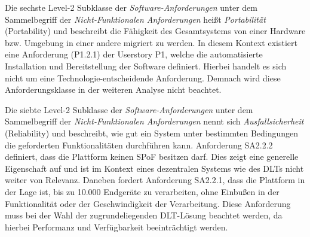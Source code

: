 Die sechste Level-2 Subklasse der \textit{Software-Anforderungen} unter dem Sammelbegriff der \textit{Nicht-Funktionalen Anforderungen} heißt \textit{Portabilität} (Portability) und beschreibt die Fähigkeit des Gesamtsystems von einer Hardware bzw. Umgebung in einer andere migriert zu werden. In diesem Kontext existiert eine Anforderung (P1.2.1) der Userstory P1, welche die automatisierte Installation und Bereitstellung der Software definiert. Hierbei handelt es sich nicht um eine Technologie-entscheidende Anforderung. Demnach wird diese Anforderungsklasse in der weiteren Analyse nicht beachtet.


Die siebte Level-2 Subklasse der \textit{Software-Anforderungen} unter dem Sammelbegriff der \textit{Nicht-Funktionalen Anforderungen} nennt sich \textit{Ausfallsicherheit} (Reliability) und beschreibt, wie gut ein System unter bestimmten Bedingungen die geforderten Funktionalitäten durchführen kann. Anforderung SA2.2.2 definiert, dass die Plattform keinen \ac{SPoF} besitzen darf. Dies zeigt eine generelle Eigenschaft auf und ist im Kontext eines dezentralen Systems wie des \acp{DLT} nicht weiter von Relevanz. Daneben fordert Anforderung SA2.2.1, dass die Plattform in der Lage ist, bis zu 10.000 Endgeräte zu verarbeiten, ohne Einbußen in der Funktionalität oder der Geschwindigkeit der Verarbeitung. Diese Anforderung muss bei der Wahl der zugrundeliegenden \ac{DLT}-Lösung beachtet werden, da hierbei Performanz und Verfügbarkeit beeinträchtigt werden.


